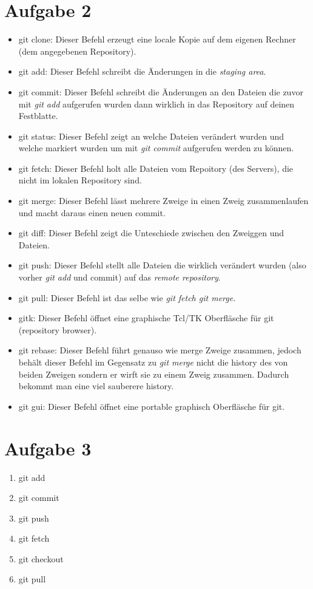 \documentclass [DIN,DIV=14,pagenumber=false,parskip=full,fromalign=left,%
fontsize=12pt,%
subject=beforeopening] {scrartcl}
\begin{document}
\section*{Aufgabe 2}
\begin{itemize}
\item git clone:
	Dieser Befehl erzeugt eine locale Kopie auf dem eigenen Rechner (dem angegebenen Repository).
\item git add:
	Dieser Befehl schreibt die Änderungen in die {\em staging area}.
\item git commit:
	Dieser Befehl schreibt die Änderungen an den Dateien die zuvor mit {\em git add} aufgerufen wurden dann wirklich in das Repository auf deinen Festblatte.
\item git status:
	Dieser Befehl zeigt an welche Dateien verändert wurden und welche markiert wurden um mit {\em git commit} aufgerufen werden zu können.
\item git fetch:
	Dieser Befehl holt alle Dateien vom Repoitory (des Servers), die nicht im lokalen Repository sind.
\item git merge:
	Dieser Befehl lässt mehrere Zweige in einen Zweig zusammenlaufen und macht daraus einen neuen commit.
\item git diff:
	Dieser Befehl zeigt die Unteschiede zwischen den Zweiggen und Dateien.
\item git push:
	Dieser Befehl stellt alle Dateien die wirklich verändert wurden (also vorher {\em git add} und {\git commit}) auf das {\em remote repository}. 
\item git pull:
	Dieser Befehl ist das selbe wie {\em git fetch git merge}.
\item gitk:
	Dieser Befehl öffnet eine graphische Tcl/TK Oberfläsche für git (repository browser).
\item git rebase:
	Dieser Befehl führt genauso wie merge Zweige zusammen, jedoch behält dieser Befehl im Gegensatz zu {\em git merge} nicht die history des von beiden Zweigen sondern er wirft sie zu einem Zweig zusammen. Dadurch bekommt man eine viel sauberere history. 
\item git gui:
	Dieser Befehl öffnet eine portable graphisch Oberfläsche für git.
\end{itemize}

\section*{Aufgabe 3}
\begin{enumerate}
\item git add
\item git commit
\item git push
\item git fetch
\item git checkout
\item git pull
\end{enumerate}
\end{document}
